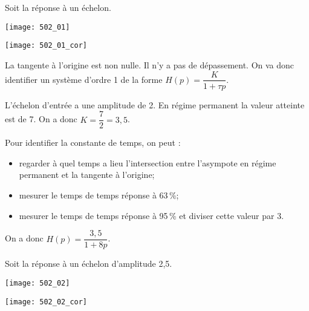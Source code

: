 \normaltrue \difficilefalse \tdifficilefalse
\correctiontrue


\setcounter{question}{0}
\ifcorrection
\else
{}
\fi


\ifprof 
\else
Soit la réponse à un échelon.
\begin{center}
\texttt{[image: 502\_01]}
\end{center}
\fi

\ifprof
\begin{center}
\texttt{[image: 502\_01\_cor]}
\end{center}

La tangente à l'origine est non nulle. Il n'y a pas de dépassement. On va donc identifier un système d'ordre 1 de la forme $H(p)=\dfrac{K}{1+\tau p}$.

L'échelon d'entrée a une amplitude de 2. En régime permanent la valeur atteinte est de 7. On a donc $K = \dfrac{7}{2}=3,5$.

Pour identifier la constante de temps, on peut : 
\begin{itemize}
\item regarder à quel temps a lieu l'intersection entre l'asympote en régime permanent et la tangente à l'origine;

\item mesurer le temps de temps réponse à 63\,\%;

\item mesurer le temps de temps réponse à 95\,\% et diviser cette valeur par 3.
\end{itemize}

On a donc $H(p)=\dfrac{3,5}{1+8p}$.
\else
\fi



\ifprof 
\else
Soit la réponse à un échelon d'amplitude 2,5.

\begin{center}
\texttt{[image: 502\_02]}
\end{center}
\fi

\ifprof
\begin{center}
\texttt{[image: 502\_02\_cor]}
\end{center}

